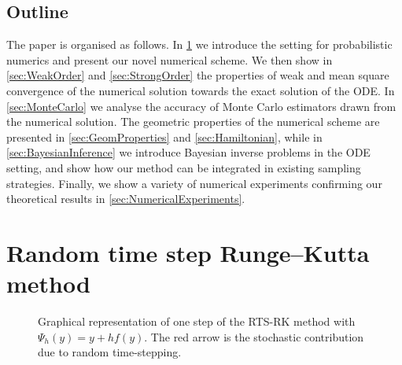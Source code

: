 \documentclass[10pt]{article}
\begin{document}
\subsection{Outline} The paper is organised as follows. In \cref{sec:MethodIntro} we introduce the setting for probabilistic numerics and present our novel numerical scheme. We then show in \cref{sec:WeakOrder} and \cref{sec:StrongOrder} the properties of weak and mean square convergence of the numerical solution towards the exact solution of the ODE. In \cref{sec:MonteCarlo} we analyse the accuracy of Monte Carlo estimators drawn from the numerical solution. The geometric properties of the numerical scheme are presented in \cref{sec:GeomProperties} and \cref{sec:Hamiltonian}, while in \cref{sec:BayesianInference} we introduce Bayesian inverse problems in the ODE setting, and show how our method can be integrated in existing sampling strategies. Finally, we show a variety of numerical experiments confirming our theoretical results in \cref{sec:NumericalExperiments}.


\section{Random time step Runge--Kutta method}\label{sec:MethodIntro}

\begin{figure}
\centering
{}
\caption{Graphical representation of one step of the RTS-RK method with $\Psi_h(y) = y + hf(y)$. The red arrow is the stochastic contribution due to random time-stepping.}
\label{fig:GraphRandomStep}
\end{figure}
\end{document}

